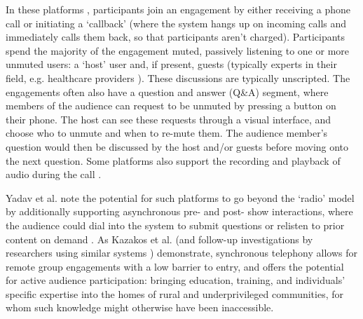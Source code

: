 In these platforms \cite{Kazakos2016, Talhouk2017, Yadav2017}, participants join an engagement by either receiving a phone call or initiating a `callback' (where the system hangs up on incoming calls and immediately calls them back, so that participants aren't charged). Participants spend the majority of the engagement muted, passively listening to one or more unmuted users: a `host' user and, if present, guests (typically experts in their field, e.g. healthcare providers \cite{Talhouk2017}). These discussions are typically unscripted. The engagements often also have a question and answer (Q\&A) segment, where members of the audience can request to be unmuted by pressing a button on their phone. The host can see these requests through a visual interface, and choose who to unmute and when to re-mute them. The audience member's question would then be discussed by the host and/or guests before moving onto the next question. Some platforms also support the recording and playback of audio during the call \cite{Talhouk2017, Yadav2017}.

Yadav et al. note the potential for such platforms to go beyond the `radio' model by additionally supporting asynchronous pre- and post- show interactions, where the audience could dial into the system to submit questions or relisten to prior content on demand \cite{Yadav2017}. As Kazakos et al. (and follow-up investigations by researchers using similar systems \cite{Talhouk2017, Yadav2017}) demonstrate, synchronous telephony allows for remote group engagements with a low barrier to entry, and offers the potential for active audience participation: bringing education, training, and individuals' specific expertise into the homes of rural and underprivileged communities, for whom such knowledge might otherwise have been inaccessible.

